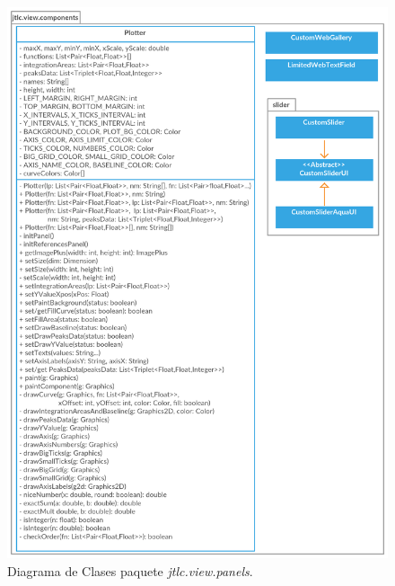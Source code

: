 \begin{figure}[H]
	\centering
	\vspace{-1.5cm}
	\includegraphics[width=425pt]{imagenes-jtlc/components}
	\centering
	\vspace{-0.5cm}
	\caption{Diagrama de Clases paquete \textit{jtlc.view.panels}.}
	\label{fig:componentsDiagrama}
\end{figure}


